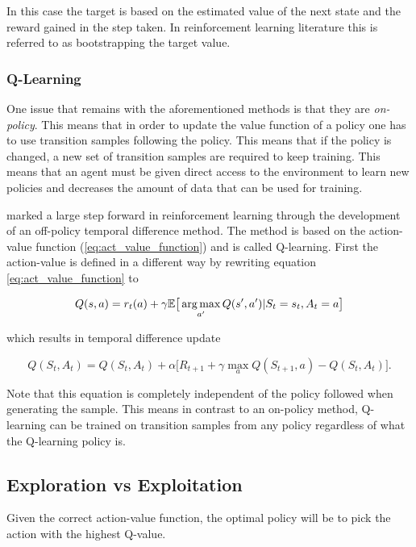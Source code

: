 In this case the target is based on the estimated value of the next state and the reward gained in the step taken. In reinforcement learning literature this is referred to as bootstrapping the target value.

\subsubsection{Q-Learning}

One issue that remains with the aforementioned methods is that they are \textit{on-policy}. This means that in order to update the value function of a policy one has to use transition samples following the policy. This means that if the policy is changed, a new set of transition samples are required to keep training. This means that an agent must be given direct access to the environment to learn new policies and decreases the amount of data that can be used for training. 

\cite{watkins_dayan_1992} marked a large step forward in reinforcement learning through the development of an off-policy temporal difference method. The method is based on the action-value function (\ref{eq:act_value_function}) and is called Q-learning. First the action-value is defined in a different way by rewriting equation \ref{eq:act_value_function} to

\begin{equation}
    Q(s, a) = r_t(a) + \gamma\mathbb{E}\big[\operatorname*{arg\,max}_{a'} Q(s',a')|S_t=s_t, A_t = a\big]
\end{equation}

which results in temporal difference update

\begin{equation}
    \label{eq:td_q_learning}
    Q(S_t, A_t) = Q(S_t, A_t) + \alpha\big[R_{t+1} + \gamma \max_a Q(S_{t+1}, a) - Q(S_t, A_t)].
\end{equation}

Note that this equation is completely independent of the policy followed when generating the sample. This means in contrast to an on-policy method, Q-learning can be trained on transition samples from any policy regardless of what the Q-learning policy is.

\subsection{Exploration vs Exploitation}

Given the correct action-value function, the optimal policy will be to pick the action with the highest Q-value.

